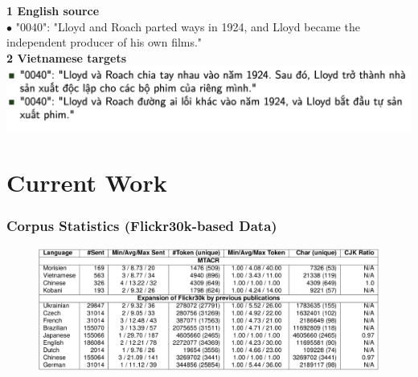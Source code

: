 \documentclass[aspectratio=169]{beamer}
\begin{document}
\begin{frame}[fragile]
\begin{minipage}{.45\textwidth}
        \centering
            \textbf{1 English source}
            \\ \tiny {\color{thiscolor}$\bullet$} "0040": "Lloyd and Roach parted ways in 1924, and Lloyd became the independent producer of his own films."
            \\ \normalsize \textbf{2 Vietnamese targets}
            \\ \includegraphics[width=\textwidth]{images/challenge-vie-2.png}
    \end{minipage}
\end{frame}




\section{Current Work}

\begin{frame}[fragile]
	\frametitle{Corpus Statistics (Flickr30k-based Data)}
    \begin{figure}
    \centering
        \includegraphics[width=1.0\textwidth]{images/MTACR-Corpus_statistics_for_Flickr30k_dataset.png} 
    \end{figure}
\end{frame}
\end{document}
